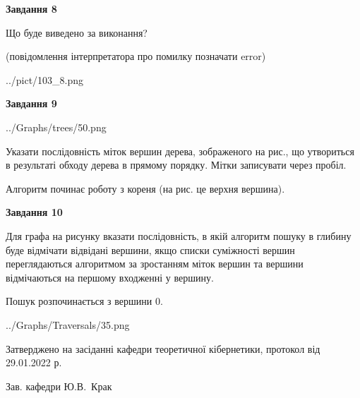 \documentclass[12pt, ukrainian]{article}
\begin{document}
{\begin {large}
{\begin {center}\textbf{Завдання 8}\end {center}}\par
Що буде виведено за виконання?\par
 (повідомлення інтерпретатора про помилку позначати error)\par
\begin{center}
	{../pict/103_8.png}
\end{center}
\newpage

{\begin {center}\textbf{Завдання 9}\end {center}}\par

\begin{center}
	{../Graphs/trees/50.png}
\end{center}
Указати послідовність міток вершин дерева, зображеного на рис., що утвориться в результаті обходу дерева в прямому порядку. Мітки записувати через пробіл.\par Алгоритм починає роботу з кореня (на рис. це верхня вершина).\par
\newpage

{\begin {center}\textbf{Завдання 10}\end {center}}\par
Для графа на рисунку вказати послідовність, в якій алгоритм пошуку в глибину буде відмічати відвідані вершини, якщо списки суміжності вершин переглядаються алгоритмом за зростанням міток вершин та вершини відмічаються на першому вход\-женні у вершину.\par
Пошук розпочинається з вершини 0.\par

\begin{center}
	{../Graphs/Traversals/35.png}
\end{center}\par
\newpage


\end {large}
}
{\smallskip \begin {small} Затверджено на засіданні кафедри теоретичної кібернетики, протокол  від   29.01.2022 р.\par\smallskip\smallskip
{\parbox {6.5 cm}{Зав. кафедри \dotfill Ю.В.~Крак}} \end{small}}
\end{document}
